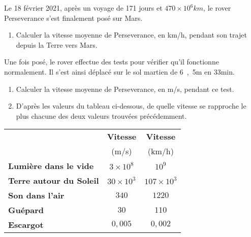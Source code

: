 \documentclass[12pt,a4paper]{article}
\begin{document}
Le 18 février 2021, après un voyage de 171 jours et $\unit{470\times10^6}{km}$, le rover Perseverance s'est finalement posé sur Mars.
\begin{enumerate}
\item \rea{} 

Calculer la vitesse moyenne de Perseverance, en km/h, pendant son trajet depuis la Terre vers Mars.
\end{enumerate}

Une fois posé, le rover effectue des tests pour vérifier qu'il fonctionne normalement.
Il s'est ainsi déplacé sur le sol martien de \unit{6{,}5}{m} en \unit{33}{min}.

\begin{enumerate}[resume]
\item \rea{}

Calculer la vitesse moyenne de Perseverance, en m/s, pendant ce test.

\item \val{}

D'après les valeurs du tableau ci-dessous, de quelle vitesse se rapproche le plus chacune des deux valeurs trouvées précédemment.
\end{enumerate}

\begin{center}
\begin{tabular}{|l|c|c|}
\hline
													& \textbf{Vitesse}		& \textbf{Vitesse} \\
													& (m/s)										& (km/h) \\
\hline
\hline
\textbf{Lumière dans le vide}	& $3\times10^8$		& $10^9$ \\
\textbf{Terre autour du Soleil}	& $30\times10^3$		& $107\times 10^3$\\
\textbf{Son dans l'air}				& $340$						& $1220$ \\
\textbf{Guépard}						& $30$						& $110$ \\
\textbf{Escargot}						& $0{,}005$	& $0{,}002$ \\
\hline

\end{tabular}
\end{center}
\end{document}
